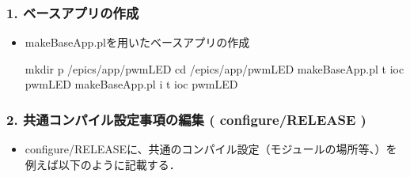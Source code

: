 \documentclass[letterpaper,10pt,dvipdfmx]{sphinxmanual}
\begin{document}
\subsubsection{1. ベースアプリの作成}
\label{\detokenize{epics/rst/example4__arduino_LEDcontrol02:id4}}\begin{itemize}
\item {} 
makeBaseApp.plを用いたベースアプリの作成

\begin{sphinxVerbatim}[commandchars=\\\{\}]
\PYGZdl{} mkdir \PYGZhy{}p \PYGZti{}/epics/app/pwmLED
\PYGZdl{} cd  \PYGZti{}/epics/app/pwmLED
\PYGZdl{} makeBaseApp.pl \PYGZhy{}t ioc pwmLED
\PYGZdl{} makeBaseApp.pl \PYGZhy{}i \PYGZhy{}t ioc pwmLED
\end{sphinxVerbatim}

\end{itemize}


\subsubsection{2. 共通コンパイル設定事項の編集 ( configure/RELEASE )}
\label{\detokenize{epics/rst/example4__arduino_LEDcontrol02:configure-release}}\begin{itemize}
\item {} 
configure/RELEASEに、共通のコンパイル設定（モジュールの場所等、）を例えば以下のように記載する．

\begin{sphinxVerbatim}[commandchars=\\\{\}]
    
  
\end{sphinxVerbatim}

\end{itemize}
\end{document}
